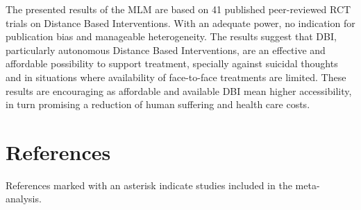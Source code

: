 \documentclass[
  english,
  man]{apa6}
\begin{document}
The presented results of the MLM are based on 41 published peer-reviewed RCT trials on Distance Based Interventions. With an adequate power, no indication for publication bias and manageable heterogeneity. The results suggest that DBI, particularly autonomous Distance Based Interventions, are an effective and affordable possibility to support treatment, specially against suicidal thoughts and in situations where availability of face-to-face treatments are limited. These results are encouraging as affordable and available DBI mean higher accessibility, in turn promising a reduction of human suffering and health care costs.

\hypertarget{references}{%
\section{References}\label{references}}

\begingroup
\setlength{\parindent}{-0.5in}
\setlength{\leftskip}{0.5in}

References marked with an asterisk indicate studies included in the meta-analysis.
\end{document}
